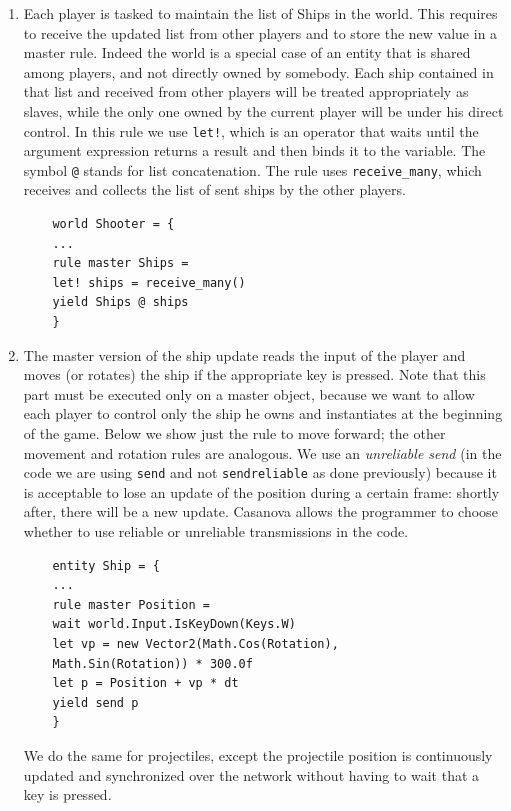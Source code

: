 \begin{enumerate}
	\item Each player is tasked to maintain the list of Ships in the world. This requires to receive the updated list from other players and to store the new value in a master rule. Indeed the world is a special case of an entity that is shared among players, and not directly owned by somebody. Each ship contained in that list and received from other players will be treated appropriately as slaves, while the only one owned by the current player will be under his direct control. In this rule we use \texttt{let!}, which is an operator that waits until the argument expression returns a result and then binds it to the variable. The symbol \texttt{@} stands for list concatenation. The rule uses \texttt{receive\_many}, which receives and collects the list of sent ships by the other players.
	
	\begin{lstlisting}
	world Shooter = {
  	...
  	rule master Ships =
  	let! ships = receive_many()
  	yield Ships @ ships
	}
	\end{lstlisting}
	
	\item The master version of the ship update reads the input of the player and moves (or rotates) the ship if the appropriate key is pressed. Note that this part must be executed only on a master object, because we want to allow each player to control only the ship he owns and instantiates at the beginning of the game. Below we show just the rule to move forward; the other movement and rotation rules are analogous. We use an \textit{unreliable send} (in the code we are using \texttt{send} and not \texttt{send\tu reliable} as done previously) because it is acceptable to lose an update of the position during a certain frame: shortly after, there will be a new update. Casanova allows the programmer to choose whether to use reliable or unreliable transmissions in the code.
	
	\begin{lstlisting}
	entity Ship = {
	...
	rule master Position =
  	wait world.Input.IsKeyDown(Keys.W)
  	let vp = new Vector2(Math.Cos(Rotation), 
  	Math.Sin(Rotation)) * 300.0f
  	let p = Position + vp * dt
  	yield send p
	}
	\end{lstlisting}
	
	We do the same for projectiles, except the projectile position is continuously updated and synchronized over the network without having to wait that a key is pressed.
	

\end{enumerate}
